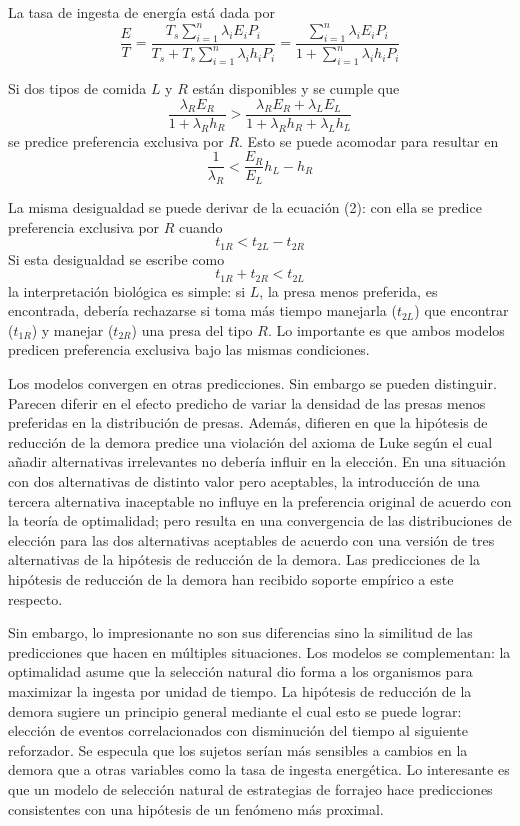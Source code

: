\documentclass[a4paper,12pt]{article}
\begin{document}
La tasa de ingesta de energía está dada por
$$
\frac{E}{T} = \frac{T_s\displaystyle\sum_{i=1}^n\lambda_iE_iP_i}{T_s+T_s\displaystyle\sum_{i=1}^n\lambda_ih_iP_i} = \frac{\displaystyle\sum_{i=1}^n\lambda_iE_iP_i}{1+\displaystyle\sum_{i=1}^n\lambda_ih_iP_i}
$$

Si dos tipos de comida $L$ y $R$ están disponibles y se cumple que
$$
\frac{\lambda_R E_R}{1+\lambda_R h_R}> \frac{\lambda_R E_R + \lambda_L E_L}{1+\lambda_R h_R + \lambda_L h_L}
$$
se predice preferencia exclusiva por $R$. Esto se puede acomodar para resultar en 
\begin{equation}
	\frac{1}{\lambda_R} < \frac{E_R}{E_L}h_L-h_R
\end{equation}

La misma desigualdad se puede derivar de la ecuación (2): con ella se predice preferencia exclusiva por $R$ cuando
\begin{equation}
	t_{1R} < t_{2L} - t_{2R}
\end{equation}
Si esta desigualdad se escribe como
$$
t_{1R} + t_{2R} < t_{2L}
$$
la interpretación biológica es simple: si $L$, la presa menos preferida, es encontrada, debería rechazarse si toma más tiempo manejarla ($t_{2L}$) que encontrar ($t_{1R}$) y manejar ($t_{2R}$) una presa del tipo $R$. Lo importante es que ambos modelos predicen preferencia exclusiva bajo las mismas condiciones.

Los modelos convergen en otras predicciones. Sin embargo se pueden distinguir. Parecen diferir en el efecto predicho de variar la densidad de las presas menos preferidas en la distribución de presas. Además, difieren en que la hipótesis de reducción de la demora predice una violación del axioma de Luke según el cual añadir alternativas irrelevantes no debería influir en la elección. En una situación con dos alternativas de distinto valor pero aceptables, la introducción de una tercera alternativa inaceptable no influye en la preferencia original de acuerdo con la teoría de optimalidad; pero resulta en una convergencia de las distribuciones de elección para las dos alternativas aceptables de acuerdo con una versión de tres alternativas de la hipótesis de reducción de la demora. Las predicciones de la hipótesis de reducción de la demora han recibido soporte empírico a este respecto.

Sin embargo, lo impresionante no son sus diferencias sino la similitud de las predicciones que hacen en múltiples situaciones. Los modelos se complementan: la optimalidad asume que la selección natural dio forma a los organismos para maximizar la ingesta por unidad de tiempo. La hipótesis de reducción de la demora sugiere un principio general mediante el cual esto se puede lograr: elección de eventos correlacionados con disminución del tiempo al siguiente reforzador. Se especula que los sujetos serían más sensibles a cambios en la demora que a otras variables como la tasa de ingesta energética. Lo interesante es que un modelo de selección natural de estrategias de forrajeo hace predicciones consistentes con una hipótesis de un fenómeno más proximal.
\end{document}
